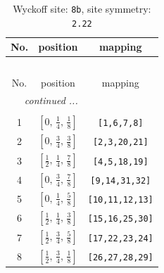 \documentclass[fleqn,8pt]{jsarticle}
\begin{document}
\begin{longtable}{ccc}
\caption{Wyckoff site: {\tt 8b}, site symmetry: {\tt 2.22}}
 \\
 \hline \hline
No. & position & mapping \\ \hline \endfirsthead

\multicolumn{2}{l}{\tablename\ \thetable{}} \\
 \hline \hline
No. & position & mapping \\ \hline \endhead

 \hline \hline
\multicolumn{2}{r}{\footnotesize\it continued ...} \\ \endfoot

 \hline \hline
\multicolumn{2}{r}{} \\ \endlastfoot

1 & $\left[ 0,\, \frac{1}{4},\, \frac{1}{8} \right]$ & {\tt [1,6,7,8]} \\ \hline
2 & $\left[ 0,\, \frac{3}{4},\, \frac{3}{8} \right]$ & {\tt [2,3,20,21]} \\ \hline
3 & $\left[ \frac{1}{2},\, \frac{1}{4},\, \frac{7}{8} \right]$ & {\tt [4,5,18,19]} \\ \hline
4 & $\left[ 0,\, \frac{3}{4},\, \frac{7}{8} \right]$ & {\tt [9,14,31,32]} \\ \hline
5 & $\left[ 0,\, \frac{1}{4},\, \frac{5}{8} \right]$ & {\tt [10,11,12,13]} \\ \hline
6 & $\left[ \frac{1}{2},\, \frac{1}{4},\, \frac{3}{8} \right]$ & {\tt [15,16,25,30]} \\ \hline
7 & $\left[ \frac{1}{2},\, \frac{3}{4},\, \frac{5}{8} \right]$ & {\tt [17,22,23,24]} \\ \hline
8 & $\left[ \frac{1}{2},\, \frac{3}{4},\, \frac{1}{8} \right]$ & {\tt [26,27,28,29]} \\
\end{longtable}
\renewcommand{\arraystretch}{1.2}
\end{document}
